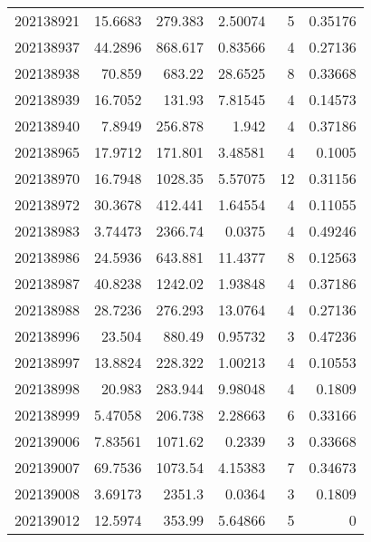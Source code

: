 \begin{tabular}{rrrrrr}
 202138921 &         15.6683  &      279.383  &            2.50074 &           5 & 0.35176 \\
 202138937 &         44.2896  &      868.617  &            0.83566 &           4 & 0.27136 \\
 202138938 &         70.859   &      683.22   &           28.6525  &           8 & 0.33668 \\
 202138939 &         16.7052  &      131.93   &            7.81545 &           4 & 0.14573 \\
 202138940 &          7.8949  &      256.878  &            1.942   &           4 & 0.37186 \\
 202138965 &         17.9712  &      171.801  &            3.48581 &           4 & 0.1005  \\
 202138970 &         16.7948  &     1028.35   &            5.57075 &          12 & 0.31156 \\
 202138972 &         30.3678  &      412.441  &            1.64554 &           4 & 0.11055 \\
 202138983 &          3.74473 &     2366.74   &            0.0375  &           4 & 0.49246 \\
 202138986 &         24.5936  &      643.881  &           11.4377  &           8 & 0.12563 \\
 202138987 &         40.8238  &     1242.02   &            1.93848 &           4 & 0.37186 \\
 202138988 &         28.7236  &      276.293  &           13.0764  &           4 & 0.27136 \\
 202138996 &         23.504   &      880.49   &            0.95732 &           3 & 0.47236 \\
 202138997 &         13.8824  &      228.322  &            1.00213 &           4 & 0.10553 \\
 202138998 &         20.983   &      283.944  &            9.98048 &           4 & 0.1809  \\
 202138999 &          5.47058 &      206.738  &            2.28663 &           6 & 0.33166 \\
 202139006 &          7.83561 &     1071.62   &            0.2339  &           3 & 0.33668 \\
 202139007 &         69.7536  &     1073.54   &            4.15383 &           7 & 0.34673 \\
 202139008 &          3.69173 &     2351.3    &            0.0364  &           3 & 0.1809  \\
 202139012 &         12.5974  &      353.99   &            5.64866 &           5 & 0       \\

\end{tabular}
